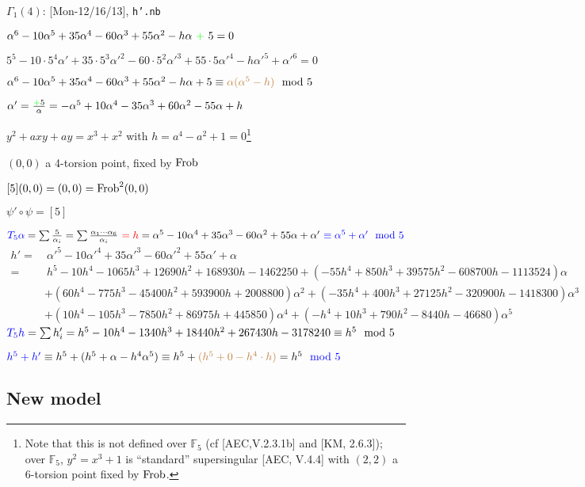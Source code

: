 \documentclass{rs}
\theoremstyle{definition}
\theoremstyle{remark}
\newcommand{\mb}[1]{\mathbb{#1}}
\newcommand{\Frob}{{\rm Frob}}
\newcommand{\BF}{{\mb F}}
\newcommand{\md}{~~{\rm mod}~}
\newcommand{\A}{\alpha}
\newcommand{\G}{\Gamma}
\numberwithin{equation}{section}
\numberwithin{thm}{section}
\begin{document}
$\G_1(4)$: \hfill [Mon-12/16/13], \texttt{h'.nb} 

$\A^6 - 10 \A^5 + 35 \A^4 - 60 \A^3 + 55 \A^2 - h \A ~\textcolor{green}{+}~ 5 = 0$ 

\hfill $5^5 - 10 \cdot 5^4 \A' + 35 \cdot 5^3 \A'^2 - 60 \cdot 5^2 \A'^3 + 55 \cdot 5 \A'^4 - h \A'^5 + \A'^6 = 0$ 

$\A^6 - 10 \A^5 + 35 \A^4 - 60 \A^3 + 55 \A^2 - h \A + 5 \equiv \textcolor{brown}{\A (\A^5 - h)} \md 5$ 

$\A' = \frac{\textcolor{green}{+}5}{\A} = -\A^5 + 10 \A^4 - 35 \A^3 + 60 \A^2 - 55 \A + h$ 

\hfill $y^2 + a x y + a y = x^3 + x^2$ with $h = a^4 - a^2 + 1 = 0$\footnote{Note that this is not defined over $\BF_5$ (cf [AEC,V.2.3.1b] and [KM, 2.6.3]); 
over $\BF_5$, $y^2 = x^3 + 1$ is ``standard'' supersingular [AEC, V.4.4] with $(2,2)$ a 6-torsion point fixed by $\Frob$.  } 

\hfill $(0,0)$ a 4-torsion point, fixed by $\Frob$ 

\hfill $[5](0,0) = (0,0) = \Frob^2(0,0)$ 

\hfill $\psi' \circ \psi = [5]$ 

$\textcolor{blue}{T_5 \A} = \sum \frac{5}{\A_i} = \sum \frac{\A_1 \cdots \A_6}{\A_i} 
~\textcolor{red}{= h} = \A^5 - 10 \A^4 + 35 \A^3 - 60 \A^2 + 55 \A + \A' ~\textcolor{blue}{\equiv \A^5 + \A' \md 5}$ 
\begin{equation*}
\begin{split}
 h' = & ~ \A'^5 - 10 \A'^4 + 35 \A'^3 - 60 \A'^2 + 55 \A' + \A \\
    = & ~ h^5 - 10 h^4 - 1065 h^3 + 12690 h^2 + 168930 h - 1462250 + (-55 h^4 + 850 h^3 + 39575 h^2 - 608700 h - 1113524) \A \\
      & + (60 h^4 - 775 h^3 - 45400 h^2 + 593900 h + 2008800) \A^2 + (-35 h^4 + 400 h^3 + 27125 h^2 - 320900 h - 1418300) \A^3 \\
      & + (10 h^4 - 105 h^3 - 7850 h^2 + 86975 h + 445850) \A^4 + (-h^4 + 10 h^3 + 790 h^2 - 8440 h - 46680) \A^5 
\end{split}
\end{equation*}
$\textcolor{blue}{T_5 h} = \sum h_i' = h^5 - 10 h^4 - 1340 h^3 + 18440 h^2 + 267430 h - 3178240 \equiv h^5 \md 5$ 

\hfill $\textcolor{blue}{h^5 + h'} \equiv h^5 + (h^5 + \A - h^4 \A^5) \equiv h^5 + \textcolor{brown}{(h^5 + 0 - h^4 \cdot h)} = h^5 \textcolor{blue}{\mod 5}$ 


\subsection{New model}
\label{new}
\end{document}
